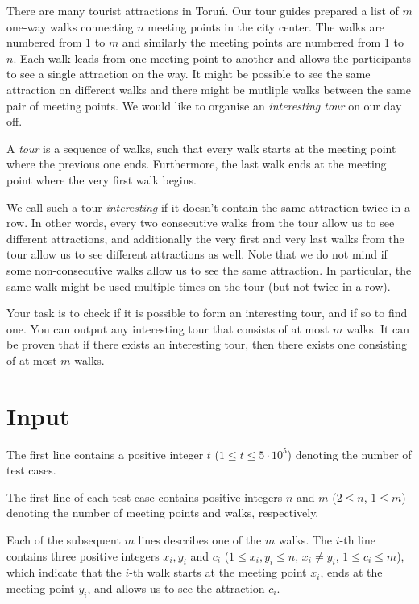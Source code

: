 There are many tourist attractions in Toruń.
Our tour guides prepared a list of $m$ one-way walks connecting $n$ meeting points in the city center.
The walks are numbered from $1$ to $m$ and similarly the meeting points are numbered from 1 to $n$.
Each walk leads from one meeting point to another and allows the participants
to see a single attraction on the way. It might be possible to see the same attraction on different walks and
there might be mutliple walks between the same pair of meeting points.
We would like to organise an \emph{interesting tour} on our day off.

A \emph{tour} is a sequence of walks,
such that every walk starts at the meeting point where the previous one ends.
Furthermore, the last walk ends at the meeting point where the very first walk begins.

We call such a tour \emph{interesting} if
it doesn't contain the same attraction twice in a row.
In other words, every two consecutive walks from the tour allow us to see different attractions,
and additionally the very first and very last walks from the tour allow us to see different attractions as well.
Note that we do not mind if some non-consecutive walks allow us to see the same attraction.
In particular, the same walk might be used multiple times on the tour (but not twice in a row).

Your task is to check if it is possible to form an interesting tour, and if so to find one.
You can output any interesting tour that consists of at most $m$ walks.
It can be proven that if there exists an interesting tour, then there exists one consisting of at most $m$ walks.

\section*{Input}
The first line contains a positive integer $t$ ($1 \leq t \leq 5\cdot10^{5}$) denoting the number of test cases.

The first line of each test case contains positive integers $n$ and $m$ ($2\leq n$, $1\leq m$) denoting the number
of meeting points and walks, respectively.

Each of the subsequent $m$ lines describes one of the $m$ walks.
The $i$-th line contains three positive integers $x_{i}, y_{i}$ and $c_{i}$
($1\leq x_{i}, y_{i}\leq n$, $x_{i} \neq y_{i}$, $1\leq c_{i}\leq m$), which indicate that the $i$-th walk
starts at the meeting point $x_{i}$, ends at the meeting point $y_{i}$, and allows us to see the attraction $c_{i}$.

